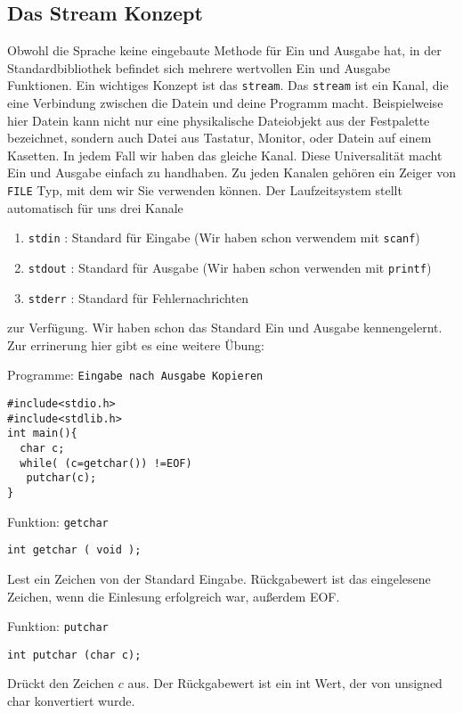 \subsection{Das Stream Konzept}

Obwohl die Sprache keine eingebaute Methode für Ein und Ausgabe hat, in der Standardbibliothek befindet sich
mehrere wertvollen Ein und Ausgabe Funktionen. Ein wichtiges Konzept ist das \texttt{stream}. Das \texttt{stream} ist ein Kanal, die
eine Verbindung zwischen die Datein und deine Programm macht. Beispielweise hier Datein kann nicht nur eine physikalische Dateiobjekt
aus der Festpalette bezeichnet, sondern auch Datei aus Tastatur, Monitor, oder Datein auf einem Kasetten. In jedem Fall wir haben das 
gleiche Kanal. Diese Universalität macht Ein und Ausgabe einfach zu handhaben. Zu jeden Kanalen gehören ein Zeiger von \texttt{FILE} Typ,
mit dem wir Sie verwenden können. Der Laufzeitsystem stellt automatisch für uns drei Kanale
\begin{enumerate}
\item \texttt{stdin} : Standard für Eingabe (Wir haben schon verwendem mit \texttt{scanf}) 
\item \texttt{stdout} : Standard für Ausgabe (Wir haben schon verwenden mit \texttt{printf})
\item \texttt{stderr} : Standard für Fehlernachrichten
\end{enumerate} zur Verfügung. Wir haben schon das Standard Ein und Ausgabe kennengelernt. Zur errinerung hier gibt es
eine weitere Übung:
\begin{myexampleprogram}{Programme: \texttt{Eingabe nach Ausgabe Kopieren}}
\begin{lstlisting}
#include<stdio.h>
#include<stdlib.h>
int main(){
  char c;
  while( (c=getchar()) !=EOF)
   putchar(c);
}
\end{lstlisting}
\end{myexampleprogram}
\begin{myexampleblock}{Funktion: \texttt{getchar}}
\begin{lstlisting}
int getchar ( void );
\end{lstlisting}
\vspace{-0.4cm}
Lest ein Zeichen von der Standard Eingabe. Rückgabewert ist das eingelesene Zeichen, wenn die Einlesung erfolgreich war, außerdem
EOF.
\end{myexampleblock}
\begin{myexampleblock}{Funktion: \texttt{putchar}}
\begin{lstlisting}
int putchar (char c);
\end{lstlisting}
\vspace{-0.4cm}
Drückt den Zeichen $c$ aus. Der Rückgabewert ist ein int Wert, der von unsigned char konvertiert wurde.
\end{myexampleblock}
